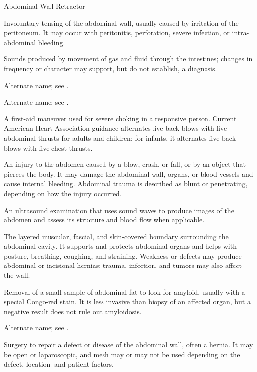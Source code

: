 \synonyms
Abdominal Wall Retractor

 Involuntary tensing of the abdominal wall, usually caused by irritation of the peritoneum. It may occur with
peritonitis, perforation, severe infection, or intra-abdominal bleeding.

 Sounds produced by movement of gas and fluid through the intestines; changes in frequency or character may support, but do not establish, a diagnosis.

 Alternate name; see .

 Alternate name; see .

 A first-aid maneuver used for severe choking in a responsive person. Current American Heart Association guidance alternates five back blows with five abdominal thrusts for adults and children; for infants, it alternates five back blows with five chest thrusts.

 An injury to the abdomen caused by a blow, crash, or fall, or by an object that pierces the body. It may damage the abdominal wall, organs, or blood vessels and cause internal bleeding. Abdominal trauma is described as blunt or penetrating, depending on how the injury occurred.

 An ultrasound examination that uses sound waves to produce images of the abdomen and assess its structure and blood flow when applicable.

 The layered muscular, fascial, and skin-covered boundary surrounding the abdominal cavity.
It supports and protects abdominal organs and helps with posture, breathing, coughing, and straining.
Weakness or defects may produce abdominal or incisional hernias; trauma, infection, and tumors may
also affect the wall.

 Removal of a small sample of abdominal fat to look for amyloid, usually with a special Congo-red stain. It is less invasive than biopsy of an affected organ, but a negative result does not rule out amyloidosis.

 Alternate name; see .

 Surgery to repair a defect or disease of the abdominal wall, often a hernia. It may be open or laparoscopic, and mesh may or may not be used depending on the defect, location, and patient factors.

